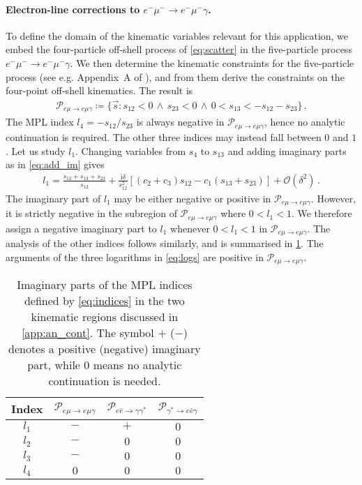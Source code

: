 \documentclass[main.tex]{subfiles}
\begin{document}
\smallskip

\paragraph{Electron-line corrections to $e^- \mu^- \to e^- \mu^- \gamma$.}
To define the domain of the kinematic variables relevant for this application, 
we embed the four-particle off-shell process of \cref{eq:scatter} in the five-particle process $e^- \mu^- \to e^- \mu^- \gamma$. We then determine the kinematic constraints for the five-particle process (see e.g. Appendix~A of ), and from them derive the constraints on the four-point off-shell kinematics. The result is
\begin{align}
\label{eq:region_emu-emugamma}
\mathcal{P}_{e\mu\to{e}\mu\gamma} \coloneqq \{\vec{s} \colon s_{12} < 0 \, \land \, s_{23} < 0 \, \land \, 0 < s_{13} < -s_{12} - s_{23} \} \,.
\end{align}
The MPL index $l_4 = - s_{12}/s_{23}$ is always negative in $\mathcal{P}_{{e}\mu\to{e}\mu\gamma}$, hence no analytic continuation is required. The other three indices may instead fall between $0$ and $1$. Let us study $l_1$. Changing variables from $s_4$ to $s_{13}$ and adding imaginary parts as in \cref{eq:add_im} gives
\begin{align}
l_1 = \frac{s_{12} + s_{13} + s_{23}}{s_{12}} +  \frac{\mathrm{i} \delta}{s_{12}^2} \left[ (c_2 + c_3) s_{12} - c_1 (s_{13} + s_{23}) \right] + \mathcal{O}\left(\delta^2\right) \,.
\end{align}
The imaginary part of $l_1$ may be either negative or positive in $\mathcal{P}_{{e}\mu\to{e}\mu\gamma} $. However, it is strictly negative in the subregion of $\mathcal{P}_{{e}\mu\to{e}\mu\gamma} $ where $0<l_1<1$. We therefore assign a negative imaginary part to $l_1$ whenever $0<l_1<1$ in $\mathcal{P}_{{e}\mu\to{e}\mu\gamma} $. The analysis of the other indices follows similarly, and is summarised in \cref{tab:an_cont}.
The arguments of the three logarithms in \cref{eq:logs} are positive in $\mathcal{P}_{e\mu\to{e}\mu\gamma}$.

\begin{table}
    \centering
    \begin{tabular}{cccc}
        \hline
        Index & $\mathcal{P}_{{e}\mu\to{e}\mu\gamma}$ & $\mathcal{P}_{{e}\bar{{e}}\to\gamma \gamma^*}$ & $\mathcal{P}_{\gamma^*\to e \bar{e} \gamma}$  \\
        \hline
        $l_1$  & $-$ & $+$ & $0$ \\
        $l_2$  & $-$ & $0$ & $0$ \\
        $l_3$  & $-$ & $0$ & $0$ \\
        $l_4$  & $0$ & $0$ & $0$ \\
        \hline
    \end{tabular}
    \caption{Imaginary parts of the MPL indices defined by \cref{eq:indices} in the two kinematic regions discussed in \cref{app:an_cont}. The symbol $+$ ($-$) denotes a positive (negative) imaginary part, while $0$ means no analytic continuation is needed.}
    \label{tab:an_cont}
\end{table}
\end{document}

